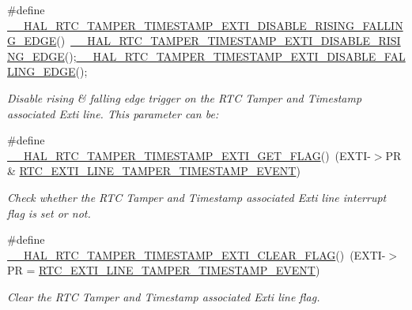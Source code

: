 \begin{DoxyCompactItemize}
\#define \hyperlink{group___r_t_c_ex___tamper___timestamp_gab62fb2a2216c82270c441c49db986411}{\+\_\+\+\_\+\+H\+A\+L\+\_\+\+R\+T\+C\+\_\+\+T\+A\+M\+P\+E\+R\+\_\+\+T\+I\+M\+E\+S\+T\+A\+M\+P\+\_\+\+E\+X\+T\+I\+\_\+\+D\+I\+S\+A\+B\+L\+E\+\_\+\+R\+I\+S\+I\+N\+G\+\_\+\+F\+A\+L\+L\+I\+N\+G\+\_\+\+E\+D\+GE}()~\hyperlink{group___r_t_c_ex___tamper___timestamp_gabe277f7ac75d1fc82355c8e0620cd94d}{\+\_\+\+\_\+\+H\+A\+L\+\_\+\+R\+T\+C\+\_\+\+T\+A\+M\+P\+E\+R\+\_\+\+T\+I\+M\+E\+S\+T\+A\+M\+P\+\_\+\+E\+X\+T\+I\+\_\+\+D\+I\+S\+A\+B\+L\+E\+\_\+\+R\+I\+S\+I\+N\+G\+\_\+\+E\+D\+GE}();\hyperlink{group___r_t_c_ex___tamper___timestamp_ga9083f587b38fcaba2d3973114a4a29b6}{\+\_\+\+\_\+\+H\+A\+L\+\_\+\+R\+T\+C\+\_\+\+T\+A\+M\+P\+E\+R\+\_\+\+T\+I\+M\+E\+S\+T\+A\+M\+P\+\_\+\+E\+X\+T\+I\+\_\+\+D\+I\+S\+A\+B\+L\+E\+\_\+\+F\+A\+L\+L\+I\+N\+G\+\_\+\+E\+D\+GE}();
\begin{DoxyCompactList}\small\item\em Disable rising \& falling edge trigger on the R\+TC Tamper and Timestamp associated Exti line. This parameter can be\+: \end{DoxyCompactList}\item 
\#define \hyperlink{group___r_t_c_ex___tamper___timestamp_ga0bc632c4efb10afdba2356aac489b5b7}{\+\_\+\+\_\+\+H\+A\+L\+\_\+\+R\+T\+C\+\_\+\+T\+A\+M\+P\+E\+R\+\_\+\+T\+I\+M\+E\+S\+T\+A\+M\+P\+\_\+\+E\+X\+T\+I\+\_\+\+G\+E\+T\+\_\+\+F\+L\+AG}()~(E\+X\+TI-\/$>$PR \& \hyperlink{group___r_t_c_ex___private___constants_gaffa3448885f1dec216899aef7f49471f}{R\+T\+C\+\_\+\+E\+X\+T\+I\+\_\+\+L\+I\+N\+E\+\_\+\+T\+A\+M\+P\+E\+R\+\_\+\+T\+I\+M\+E\+S\+T\+A\+M\+P\+\_\+\+E\+V\+E\+NT})
\begin{DoxyCompactList}\small\item\em Check whether the R\+TC Tamper and Timestamp associated Exti line interrupt flag is set or not. \end{DoxyCompactList}\item 
\#define \hyperlink{group___r_t_c_ex___tamper___timestamp_gae09eceae702ba11106cd04f6ea43b06a}{\+\_\+\+\_\+\+H\+A\+L\+\_\+\+R\+T\+C\+\_\+\+T\+A\+M\+P\+E\+R\+\_\+\+T\+I\+M\+E\+S\+T\+A\+M\+P\+\_\+\+E\+X\+T\+I\+\_\+\+C\+L\+E\+A\+R\+\_\+\+F\+L\+AG}()~(E\+X\+TI-\/$>$PR = \hyperlink{group___r_t_c_ex___private___constants_gaffa3448885f1dec216899aef7f49471f}{R\+T\+C\+\_\+\+E\+X\+T\+I\+\_\+\+L\+I\+N\+E\+\_\+\+T\+A\+M\+P\+E\+R\+\_\+\+T\+I\+M\+E\+S\+T\+A\+M\+P\+\_\+\+E\+V\+E\+NT})
\begin{DoxyCompactList}\small\item\em Clear the R\+TC Tamper and Timestamp associated Exti line flag. \end{DoxyCompactList}\item 

\end{DoxyCompactItemize}
